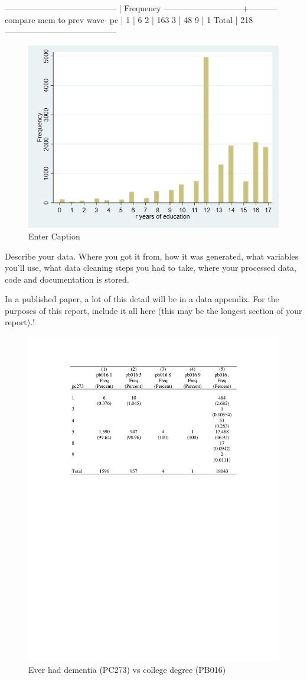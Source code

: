 \documentclass{article}
\begin{document}
-----------------------------------------
                             |  Frequency
-----------------------------+-----------
compare mem to prev wave- pc |           
  1                          |          6
  2                          |        163
  3                          |         48
  9                          |          1
  Total                      |        218
-----------------------------------------

\begin{figure}
    \centering
    \includegraphics[width=0.5\linewidth]{frequency_histogram_pz216.png}
    \caption{Enter Caption}
    \label{fig:enter-label}
\end{figure}


Describe your data. Where you got it from, how it was generated, what variables you'll use, what data cleaning steps you had to take, where your processed data, code and documentation is stored.

In a published paper, a lot of this detail will be in a data appendix. For the purposes of this report, include it all here (this may be the longest section of your report).!

\begin{figure}
    \centering
    \includegraphics[width=0.5\linewidth]{ever had dementia vs r college degree ctab.doc.pdf}
    \caption{Ever had dementia (PC273) vs college degree (PB016)}
    \label{fig:enter-label}
\end{figure}
\end{document}
